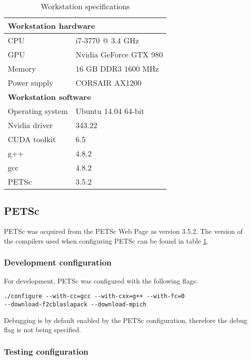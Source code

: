 \begin{table}[h]
	\begin{center}
	\bgroup
	\def\arraystretch{1.2}
	\begin{tabular}{|l|l|}
		\hline
		\multicolumn{2}{|l|}{\textbf{Workstation hardware}} \\ \hline
		CPU & i7-3770 @ 3.4 GHz \\ \hline
		GPU & Nvidia GeForce GTX 980 \\ \hline
		Memory & 16 GB DDR3 1600 MHz \\ \hline
		Power supply & CORSAIR AX1200 \\ \hline
		\multicolumn{2}{|l|}{\textbf{Workstation software}} \\ \hline
		Operating system & Ubuntu 14.04 64-bit \\ \hline
		Nvidia driver & 343.22 \\ \hline
		CUDA toolkit & 6.5 \\ \hline
		g++ & 4.8.2 \\ \hline
		gcc & 4.8.2 \\ \hline
		PETSc & 3.5.2 \\ \hline
	\end{tabular}
	\egroup
	\end{center}
	\caption{Workstation specifications}
	\label{table:workstation}
\end{table}

\subsection{PETSc}

PETSc was acquired from the PETSc Web Page\cite{petsc-web-page} as version 3.5.2. 
The version of the compilers used when configuring PETSc can be found in table 
\ref{table:workstation}.

\subsubsection{Development configuration}

For development, PETSc was configured with the following flags:
\lstset{language=bash}
\begin{lstlisting}
./configure --with-cc=gcc --with-cxx=g++ --with-fc=0 
--download-f2cblaslapack --download-mpich
\end{lstlisting}
Debugging is by default enabled by the PETSc configuration, therefore the debug 
flag is not being specified.

\subsubsection{Testing configuration}

